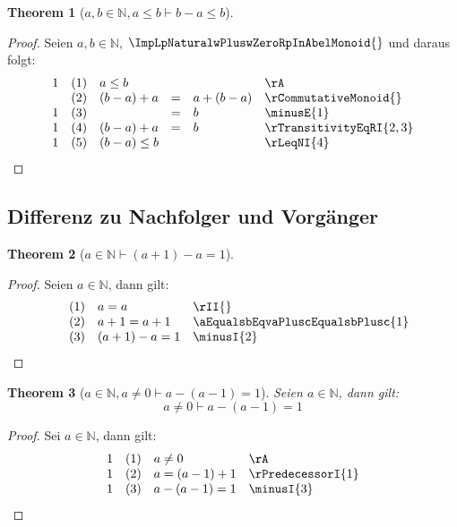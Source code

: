 \documentclass{book}
\theoremstyle{plain}
\newtheorem{theorem}{Theorem}
\theoremstyle{remark}
\theoremstyle{definition}
\begin{document}
\label{awbInNaturalaLeqbImpbMinusaLeqb}
\begin{theorem}[\(a,b\in\mathbb{N},a\leq b\vdash b-a\leq b\)]
\end{theorem}
\begin{proof}
    Seien \(a,b\in\mathbb{N}\), \(\ImpLpNaturalwPluswZeroRpInAbelMonoid{}\) und daraus folgt:
        \[
	\begin{array}{lllcll}
                1 &  (1) & \multicolumn{3}{l}{a\leq b} & \rA \\
                  &  (2) & (b-a)+a&=&a+(b-a) & \rCommutativeMonoid{} \\
                1 &  (3) & &=&b & \minusE{1} \\
                1 &  (4) & (b-a)+a&=&b & \rTransitivityEqRI{2,3} \\
                1 &  (5) & \multicolumn{3}{l}{(b-a)\leq b} & \rLeqNI{4} \\
    \end{array}
	\]
\end{proof}


\subsection{Differenz zu Nachfolger und Vorgänger}

\label{aInNaturalImpLpaPlusOneRpMinusaEqualsOne}
\begin{theorem}[\(a\in\mathbb{N}\vdash (a+1)-a=1\)]
\end{theorem}
\begin{proof}
    Seien \(a\in\mathbb{N}\), dann gilt:
        \[
	\begin{array}{llll}
                &  (1) & a=a & \rII{} \\
                &  (2) & a+1=a+1 & \aEqualsbEqvaPluscEqualsbPlusc{1} \\
                &  (3) & (a+1)-a=1 & \minusI{2} \\
    \end{array}
	\]
\end{proof}

\label{aInNaturalwaNotEqualsZeroImpaMinusLpaMinusOneRpEqualsOne}
\begin{theorem}[\(a\in\mathbb{N},a\neq 0\vdash a-(a-1)=1\)]
Seien \(a\in\mathbb{N}\), dann gilt:
\[a\neq 0\vdash a-(a-1)=1\]
\end{theorem}
\begin{proof}
    Sei \(a\in\mathbb{N}\), dann gilt:
        \[
	\begin{array}{llll}
            1   &  (1) & a\neq 0 & \rA \\
            1   &  (2) & a=(a-1)+1 & \rPredecessorI{1} \\
            1   &  (3) & a-(a-1)=1 & \minusI{3} \\
    \end{array}
	\]
\end{proof}
\end{document}
